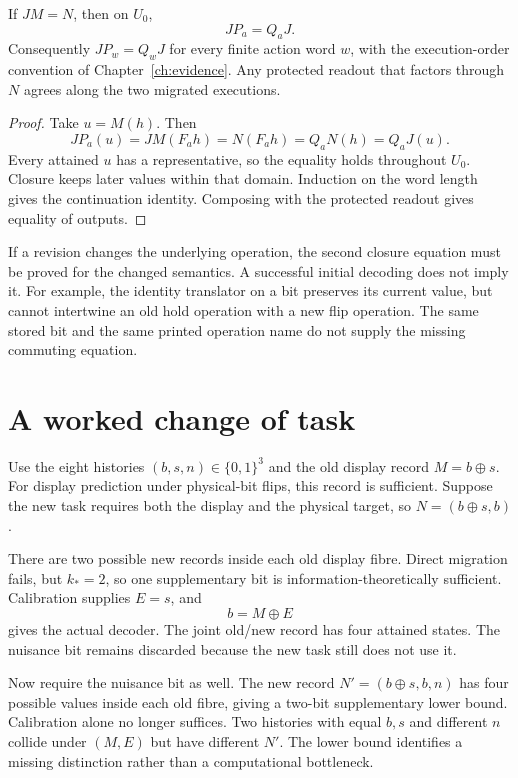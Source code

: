 \begin{theorem}\label{r:migration-operations}
If $JM=N$, then on $U_0$,
\[
 JP_a=Q_aJ.
\]
Consequently $JP_w=Q_wJ$ for every finite action word $w$, with the execution-order convention of Chapter~\ref{ch:evidence}. Any protected readout that factors through $N$ agrees along the two migrated executions.
\end{theorem}
\begin{proof}
Take $u=M(h)$. Then
\[
 JP_a(u)=JM(F_a h)=N(F_a h)=Q_aN(h)=Q_aJ(u).
\]
Every attained $u$ has a representative, so the equality holds throughout $U_0$. Closure keeps later values within that domain. Induction on the word length gives the continuation identity. Composing with the protected readout gives equality of outputs.
\end{proof}

If a revision changes the underlying operation, the second closure equation must be proved for the changed semantics. A successful initial decoding does not imply it. For example, the identity translator on a bit preserves its current value, but cannot intertwine an old hold operation with a new flip operation. The same stored bit and the same printed operation name do not supply the missing commuting equation.

\section{A worked change of task}
Use the eight histories $(b,s,n)\in\{0,1\}^3$ and the old display record $M=b\oplus s$. For display prediction under physical-bit flips, this record is sufficient. Suppose the new task requires both the display and the physical target, so $N=(b\oplus s,b)$.

There are two possible new records inside each old display fibre. Direct migration fails, but $k_*=2$, so one supplementary bit is information-theoretically sufficient. Calibration supplies $E=s$, and
\[
 b=M\oplus E
\]
gives the actual decoder. The joint old/new record has four attained states. The nuisance bit remains discarded because the new task still does not use it.

Now require the nuisance bit as well. The new record $N'=(b\oplus s,b,n)$ has four possible values inside each old fibre, giving a two-bit supplementary lower bound. Calibration alone no longer suffices. Two histories with equal $b,s$ and different $n$ collide under $(M,E)$ but have different $N'$. The lower bound identifies a missing distinction rather than a computational bottleneck.

